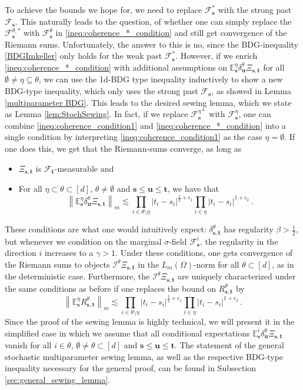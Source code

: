 \documentclass[11pt,oneside,english,reqno]{amsart}
\numberwithin{equation}{section}
\numberwithin{figure}{section}
\theoremstyle{plain}
\theoremstyle{definition}
\theoremstyle{remark}
\theoremstyle{plain}
\theoremstyle{plain}
\theoremstyle{plain}
\theoremstyle{plain}
\theoremstyle{plain}
\newcommand{\cF}{\mathcal{F}}
\newcommand{\cI}{\mathcal{I}}
\newcommand{\EE}{\mathbb{E}}
\newcommand{\bu}{\mathbf{u}}
\newcommand{\bs}{\mathbf{s}}
\newcommand{\bt}{\mathbf{t}}
\newcommand{\norm}[1]{\left\lVert #1\right\rVert}
\newcommand{\abs}[1]{\left\lvert #1\right\rvert}
\begin{document}
To achieve the bounds we hope for, we need to replace $\cF^*_\bs$ with the strong past $\cF_\bs$. This naturally leads to the question, of whether one can simply replace the $\cF^{\theta,*}_\bs$ with $\cF_\bs^\theta$ in \eqref{ineq:coherence_*_condition} and still get convergence of the Riemann sums. Unfortunately, the answer to this is no, since the BDG-inequality \eqref{BDGImkeller} only holds for the weak past $\cF^*_\bs$.
%
However, if we enrich \eqref{ineq:coherence_*_condition} with additional assumptions on $\EE^\eta_\bs \delta^\theta_\bu\Xi_{\bs,\bt}$ for all $\emptyset\neq\eta\subseteq\theta$, we can use the 1d-BDG type inequality inductively to show a new BDG-type inequality, which only uses the strong past $\cF_\bs$, as showed in Lemma \ref{multiparameter BDG}. This leads to the desired sewing lemma, which we state as Lemma \ref{lem:StochSewing}. In fact, if we replace $\cF_\bs^{\eta*}$ with $\cF_\bs^\eta$, one can combine \eqref{ineq:coherence_condition1} and \eqref{ineq:coherence_*_condition} into a single condition by interpreting \eqref{ineq:coherence_condition1} as the case $\eta = \emptyset$. If one does this, we get that the Riemann-sums converge, as long as
%
\begin{itemize}
    \item $\Xi_{\bs,\bt}$ is $\cF_\bt$-measurable and
    \item For all $\eta\subset\theta\subset[d]$, $\theta\neq\emptyset$ and $\bs\le\bu\le\bt$, we have that
    \begin{equation*}
        \norm{\EE^\eta_\bs\delta^\theta_\bu\Xi_{\bs,\bt}}_m\lesssim \prod_{i\in\theta\setminus\eta}\abs{t_i-s_i}^{\frac12+\epsilon_1}\prod_{i\in\eta}\abs{t_i-s_i}^{1+\epsilon_2}\,.
    \end{equation*}
\end{itemize}
%
These conditions are what one would intuitively expect: $\delta^\theta_{\bs,\bt}$ has regularity $\beta>\frac 12$, but whenever we condition on the marginal $\sigma$-field $\cF^i_\bs$, the regularity in the direction $i$ increases to a $\gamma>1$. Under these conditions, one gets convergence of the Riemann sums to objects $\cI^\theta\Xi_{\bs,\bt}$ in the $L_m(\Omega)$-norm for all $\theta\subset[d]$, as in the deterministic case. Furthermore, the $\cI^\theta\Xi_{\bs,\bt}$ are uniquely characterized under the same conditions as before if one replaces the bound on $R^\theta_{\bs,\bt}$ by
%
\begin{equation*}
    \norm{\EE^\eta_\bs R^\theta_{\bs,\bt}}_m \lesssim \prod_{i\in\theta\setminus\eta}\abs{t_i-s_i}^{\frac 12+\epsilon_1}\prod_{i\in\eta}\abs{t_i-s_i}^{1+\epsilon_2}\,.
\end{equation*}
%
Since the proof of the sewing lemma is highly technical, we will present it in the simplified case in which we assume that all conditional expectations $\EE^i_\bs\delta^\theta_\bu\Xi_{\bs,\bt}$ vanish for all $i\in\theta$, $\emptyset\neq\theta\subset[d]$ and $\bs\le\bu\le\bt$. The statement of the general stochastic multiparameter sewing lemma, as well as the respective BDG-type inequality necessary for the general proof, can be found in Subsection \ref{sec:general_sewing_lemma}.
\end{document}
